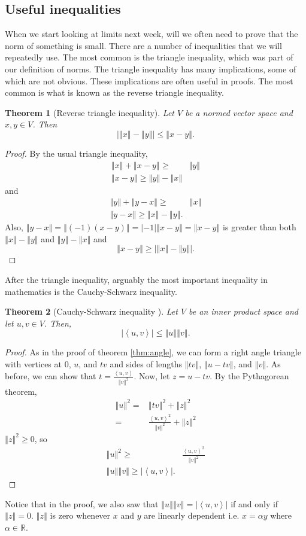 \documentclass[12pt,reqno]{amsart}
\newtheorem{theorem}{Theorem}[section]
\theoremstyle{definition}
\def\R{\mathbb{R}}
\newcommand{\iprod}[2]{\left\langle {#1} , {#2} \right\rangle}
\newcommand{\norm}[1]{\left\Vert {#1} \right\Vert}
\begin{document}
\subsection{Useful inequalities}
When we start looking at limits next week, will we often need to prove
that the norm of something is small. There are a number of
inequalities that we will repeatedly use. The most common is the
triangle inequality, which was part of our definition of norms.  The
triangle inequality has many implications, some of which are not
obvious. These implications are often useful in proofs. The most
common is what is known as the reverse triangle inequality.
\begin{theorem}[Reverse triangle inequality]
  Let $V$ be a normed vector space and $x,y \in V$. Then
  \[ \left| \norm{x} - \norm{y} \right| \leq \norm{x-y}. \]
\end{theorem}
\begin{proof}
  By the usual triangle inequality,
  \begin{align*}
    \norm{x} + \norm{x-y} \geq & \norm{y} \\
    \norm{x-y} \geq \norm{y} - \norm{x}
  \end{align*}
  and
  \begin{align*}
    \norm{y} + \norm{y-x} \geq & \norm{x} \\
    \norm{y-x} \geq \norm{x} - \norm{y}.
  \end{align*}
  Also, $\norm{y-x} = \norm{(-1)(x-y)} = |-1| \norm{x-y} =
  \norm{x-y}$ is greater than both $\norm{x}-\norm{y}$ and
  $\norm{y}-\norm{x}$ and 
  \[ \norm{x-y} \geq \left| \norm{x} - \norm{y} \right|. \]
\end{proof}

After the triangle inequality, arguably the most important inequality
in mathematics is the Cauchy-Schwarz inequality. 
\begin{theorem}[Cauchy-Schwarz inequality \label{thm:cauchy-schwarz}]
  Let $V$ be an inner product space and let $u,v\in V$. Then,
  \[ \left\vert \iprod{u}{v} \right\vert \leq \norm{u}\norm{v}. \]
\end{theorem}
\begin{proof}
  As in the proof of theorem \ref{thm:angle}, we can form a right
  angle triangle with vertices at $0$, $u$, and $tv$ and sides of
  lengths $\norm{tv}$, $\norm{u-tv}$, and $\norm{v}$. As before, we can
  show that $t = \frac{\iprod{u}{v}}{\norm{v}^2}$. Now, let $z =
  u-tv$. By the Pythagorean theorem,
  \begin{align*}
    \norm{u}^2 = & \norm{tv}^2 + \norm{z}^2 \\
    = & \frac{\iprod{u}{v}^2}{\norm{v}^2} + \norm{z}^2 
  \end{align*}
  $\norm{z}^2\geq 0$, so
  \begin{align*}
    \norm{u}^2 \geq & \frac{\iprod{u}{v}^2}{\norm{v}^2} \\
    \norm{u}\norm{v} \geq |\iprod{u}{v}|.
  \end{align*}
\end{proof}
Notice that in the proof, we also saw that  $\norm{u}\norm{v} =
|\iprod{u}{v}|$ if and only if $\norm{z} = 0$. $\norm{z}$ is zero
whenever $x$ and $y$ are linearly dependent i.e. $x = \alpha y$ where
$\alpha \in \R$. 
\end{document}

